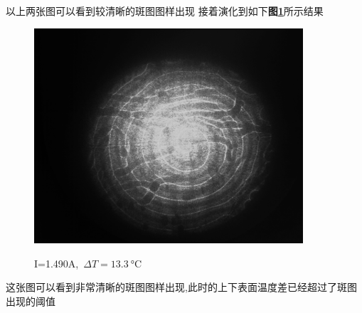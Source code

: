 \documentclass[a4paper]{article}
\begin{document}
以上两张图可以看到较清晰的斑图图样出现
\newpage
接着演化到如下\textbf{图\ref{result:fig9}}所示结果
\begin{figure}[H]
 \centering
 \caption{I=1.490A,\ $\Delta T=\SI{13.3}{\celsius}$}
 \includegraphics[height=8cm, width=10cm]{images/38.4_51.7_1.490_5.11.bmp}
 \label{result:fig9}
\end{figure}
这张图可以看到非常清晰的斑图图样出现,此时的上下表面温度差已经超过了斑图出现的阈值
\end{document}

